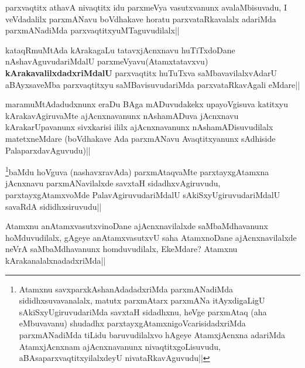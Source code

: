 
\begin{artha}
parxvaqtitx athavA nivaqtitx idu parxmeVya vasutxvanunx avalaMbisuvadu, I veVdadalilx parxmANavu boVdhakave horatu parxvataRkavalalx adariMda parxmANadiMda parxvaqtitxyuMTaguvudilalx||
\end{artha}

\begin{artha}
kataqRmuMtAda kArakagaLu tatavxjAcnxnavu huTiTxdoDane nAshavAguvudariMdalU parxmeVyavu(Atamxtatavxvu) \textbf{kArakavalilxdadxriMdalU} parxvaqtitx huTuTxva saMbavavilalxvAdarU aBAyxsaveMba parxvaqtitxyu saMBavisuvudariMda parxvataRkavAgali eMdare||
\end{artha}

\begin{artha}
maramuMtAdadudxnunx eraDu BAga mADuvudakekx upayoVgisuva katitxyu kArakavAgiruvaMte ajAcnxnavanunx nAshamADuva jAcnxnavu kArakarUpavanunx sivxkarisi ililx ajAcnxnavanunx nAshamADisuvudilalx matetxneMdare (boVdhakave Ada parxmANavu Avaqtitxyanunx sAdhiside PalaparxdavAguvudu)||
\end{artha}

\begin{artha}
\footnote{Atamxnu savxparxkAshanAdadadxriMda parxmANadiMda sididhxsuvavanalalx, matutx parxmAtarx parxmANa itAyxdigaLigU sAkiSxyUgiruvudariMda savxtaH sidadhxnu, heVge parxmAtaq (aha eMbuvavanu) shudadhx parxtayxgAtamxnigoVcarisidadxriMda parxmANadiMda  tiLidu baruvudilalxvo hAgeye AtamxjAcnxna adariMda AtamxjAcnxnam ajAcnxnavanunx nivaqtitxgoLisuvudu, aBAsaparxvaqtitxyilalxdeyU nivataRkavAguvudu||}baMdu hoVguva (nashavxravAda) parxmAtaqvaMte parxtayxgAtamxna jAcnxnavu parxmANavilalxde savxtaH sidadhxvAgiruvudu, parxtayxgAtamxvoMde PalavAgiruvudariMdalU sAkiSxyUgiruvudariMdalU savaRdA sididhxsiruvudu||
\end{artha}


\begin{artha}
Atamxnu anAtamxvasutxvinoDane ajAcnxnavilalxde saMbaMdhavanunx hoMduvudilalx, gAgeye anAtamxvasutxvU saha AtamxnoDane ajAcnxnavilalxde neVrA saMbaMdhavanunx homduvudilalx, EkeMdare? Atamxnu kArakanalalxnadadxriMda||
\end{artha}


